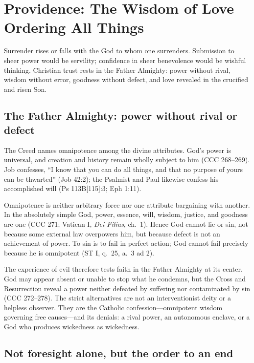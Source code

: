 \section{Providence: The Wisdom of Love Ordering All Things}

Surrender rises or falls with the God to whom one surrenders. Submission to
sheer power would be servility; confidence in sheer benevolence would be wishful
thinking. Christian trust rests in the Father Almighty: power without rival,
wisdom without error, goodness without defect, and love revealed in the
crucified and risen Son.

\subsection{The Father Almighty: power without rival or defect}

The Creed names omnipotence among the divine attributes. God's power is universal, and creation and history remain wholly subject to him (CCC 268--269). Job confesses, ``I know that you can do all things, and that no purpose of yours can be thwarted'' (Job 42:2); the Psalmist and Paul likewise confess his accomplished will (Ps 113B[115]:3; Eph 1:11).

Omnipotence is neither arbitrary force nor one attribute bargaining with another. In the absolutely simple God, power, essence, will, wisdom, justice, and goodness are one (CCC 271; Vatican I, \emph{Dei Filius}, ch.~1). Hence God cannot lie or sin, not because some external law overpowers him, but because defect is not an achievement of power. To sin is to fail in perfect action; God cannot fail precisely because he is omnipotent (ST I, q.~25, a.~3 ad 2).

The experience of evil therefore tests faith in the Father Almighty at its center. God may appear absent or unable to stop what he condemns, but the Cross and Resurrection reveal a power neither defeated by suffering nor contaminated by sin (CCC 272--278). The strict alternatives are not an interventionist deity or a helpless observer. They are the Catholic confession---omnipotent wisdom governing free causes---and its denials: a rival power, an autonomous enclave, or a God who produces wickedness as wickedness.

\subsection{Not foresight alone, but the order to an end}

